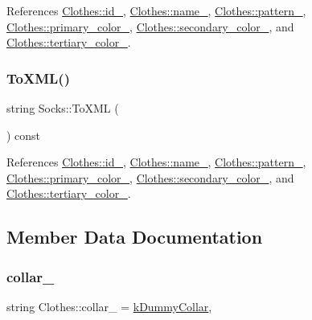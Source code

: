 References \mbox{\hyperlink{classClothes_a8978d931db5ca47c3ccea30def4ae83e}{Clothes\+::id\+\_\+}}, \mbox{\hyperlink{classClothes_a7f2275aaae24224d60c48af922c31b65}{Clothes\+::name\+\_\+}}, \mbox{\hyperlink{classClothes_a1d40145a4eb6d28441f112f030ab5d35}{Clothes\+::pattern\+\_\+}}, \mbox{\hyperlink{classClothes_a7cb005bf6cbb7f4eaa40f1b31817559c}{Clothes\+::primary\+\_\+color\+\_\+}}, \mbox{\hyperlink{classClothes_ab8f55f67b956b25d71260cffcf273673}{Clothes\+::secondary\+\_\+color\+\_\+}}, and \mbox{\hyperlink{classClothes_a3c5f1e7ab531e3ba7a38b930da8078a0}{Clothes\+::tertiary\+\_\+color\+\_\+}}.

\mbox{\label{classSocks_a5ecf1671277183b60f8eea7020cf32ed}} 
\subsubsection{\texorpdfstring{To\+X\+M\+L()}{ToXML()}}
{\footnotesize\ttfamily string Socks\+::\+To\+X\+ML (\begin{DoxyParamCaption}{ }\end{DoxyParamCaption}) const}



References \mbox{\hyperlink{classClothes_a8978d931db5ca47c3ccea30def4ae83e}{Clothes\+::id\+\_\+}}, \mbox{\hyperlink{classClothes_a7f2275aaae24224d60c48af922c31b65}{Clothes\+::name\+\_\+}}, \mbox{\hyperlink{classClothes_a1d40145a4eb6d28441f112f030ab5d35}{Clothes\+::pattern\+\_\+}}, \mbox{\hyperlink{classClothes_a7cb005bf6cbb7f4eaa40f1b31817559c}{Clothes\+::primary\+\_\+color\+\_\+}}, \mbox{\hyperlink{classClothes_ab8f55f67b956b25d71260cffcf273673}{Clothes\+::secondary\+\_\+color\+\_\+}}, and \mbox{\hyperlink{classClothes_a3c5f1e7ab531e3ba7a38b930da8078a0}{Clothes\+::tertiary\+\_\+color\+\_\+}}.



\subsection{Member Data Documentation}
\mbox{\label{classClothes_ae2e5026257b3a2f2ddbf61757fd3b57b}} 
\subsubsection{\texorpdfstring{collar\+\_\+}{collar\_}}
{\footnotesize\ttfamily string Clothes\+::collar\+\_\+ = \mbox{\hyperlink{clothes_8h_ac06c9f556f68bcd2829e36c55b70a86e}{k\+Dummy\+Collar}}\hspace{0.3cm}{\ttfamily [protected]}, {\ttfamily [inherited]}}



